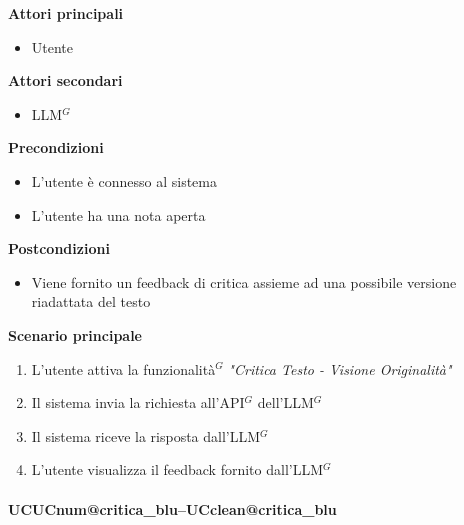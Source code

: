 \documentclass[a4paper,10pt]{article}
\makeatletter
\def\UCText#1{UC\csname UCnum@#1\endcsname\space--\space\csname UCclean@#1\endcsname}%
\makeatother
\begin{document}
    \textbf{Attori principali}
    \begin{itemize}
        \item Utente
    \end{itemize}
    \textbf{Attori secondari}
    \begin{itemize}
        \item LLM$^G$
    \end{itemize}
    \textbf{Precondizioni}
    \begin{itemize}
        \item L'utente è connesso al sistema
        \item L'utente ha una nota aperta
    \end{itemize}
    \textbf{Postcondizioni}
    \begin{itemize}
        \item Viene fornito un feedback di critica assieme ad una possibile versione riadattata del testo
    \end{itemize}
    \textbf{Scenario principale}
    \begin{enumerate}
        \item L'utente attiva la funzionalità$^G$ \textit{"Critica Testo - Visione Originalità"}
        \item Il sistema invia la richiesta all'API$^G$ dell'LLM$^G$
        \item Il sistema riceve la risposta dall'LLM$^G$
        \item L'utente visualizza il feedback fornito dall'LLM$^G$
    \end{enumerate}

    \paragraph{\UCText{critica_blu}}
\end{document}
